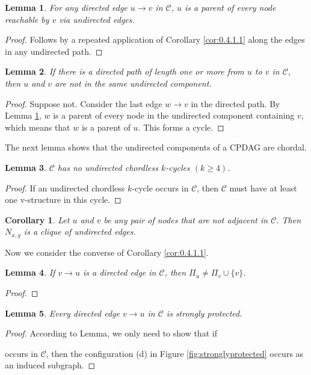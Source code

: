 \documentclass{article}
\newtheorem{corollary}{Corollary}[theorem]
\newtheorem{lemma}{Lemma}[section]
\theoremstyle{definition}
\renewcommand{\geq}{\geqslant}
\newcommand{\cC}{\mathcal{C}}
\newcommand{\<}{\left\langle}
\renewcommand{\>}{\right\rangle}
\begin{document}
\begin{lemma}\label{lem:0.4.6}
    For any directed edge $u \rightarrow v$ in $\cC$, $u$ is a parent of every node reachable by $v$ via undirected edges.
\end{lemma}
\begin{proof}
    Follows by a repeated application of Corollary \ref*{cor:0.4.1.1} along the edges in any undirected path.
\end{proof}

\begin{lemma}\label{lem:0.4.7}
    If there is a directed path of length one or more from $u$ to $v$ in $\cC$, then $u$ and $v$ are not in the same undirected component.
\end{lemma}
\begin{proof}
    Suppose not. Consider the last edge $w \rightarrow v$ in the directed path. By Lemma \ref*{lem:0.4.6}, $w$ is a parent of every node in the undirected component containing $v$, which means that $w$ is a parent of $u$. This forms a cycle.
\end{proof}

The next lemma shows that the undirected components of a CPDAG are chordal.
\begin{lemma}\label{lem:0.4.5}
    $\cC$ has no undirected chordless $k$-cycles $(k\geq 4)$.
\end{lemma}
\begin{proof}
    If an undirected chordless $k$-cycle occurs in $\cC$, then $\cC$ must have at least one v-structure in this cycle.
\end{proof}

\begin{corollary}
    Let $u$ and $v$ be any pair of nodes that are not adjacent in $\cC$. Then $N_{x,y}$ is a clique of undirected edges.
\end{corollary}

Now we consider the converse of Corollary \ref*{cor:0.4.1.1}.

\begin{lemma}
    If $v\rightarrow u$ is a directed edge in $\cC$, then $\Pi_u\neq \Pi_v\cup\{v\}$.
\end{lemma}
\begin{proof}
    
\end{proof}


\begin{lemma}
    Every directed edge $v\rightarrow u$ in $\cC$ is strongly protected.
\end{lemma}
\begin{proof}
    According to Lemma, we only need to show that if  occurs in $\cC$, then the configuration (d) in Figure \ref{fig:stronglyprotected} occurs as an induced subgraph.
\end{proof}
\end{document}
